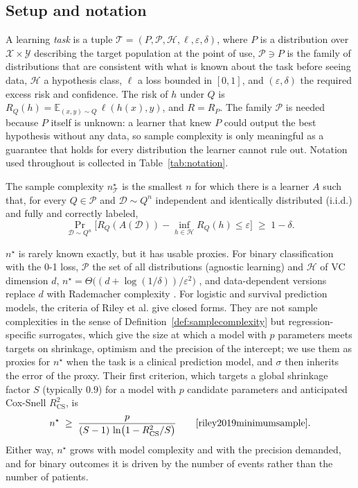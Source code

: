 \documentclass[acmsmall,screen,review]{acmart}
\theoremstyle{acmdefinition}
\begin{document}
\subsection{Setup and notation}

A learning \emph{task} is a tuple $\mathcal{T}=(P,\mathcal{P},\mathcal{H},\ell,\varepsilon,\delta)$, where $P$ is a distribution over $\mathcal{X}\times\mathcal{Y}$ describing the target population at the point of use, $\mathcal{P}\ni P$ is the family of distributions that are consistent with what is known about the task before seeing data, $\mathcal{H}$ a hypothesis class, $\ell$ a loss bounded in $[0,1]$, and $(\varepsilon,\delta)$ the required excess risk and confidence. The risk of $h$ under $Q$ is $R_Q(h)=\mathbb{E}_{(x,y)\sim Q}\,\ell(h(x),y)$, and $R=R_P$. The family $\mathcal{P}$ is needed because $P$ itself is unknown: a learner that knew $P$ could output the best hypothesis without any data, so sample complexity is only meaningful as a guarantee that holds for every distribution the learner cannot rule out. Notation used throughout is collected in Table~\ref{tab:notation}.

\begin{definition}\label{def:samplecomplexity}
The sample complexity $n^{\star}_{\mathcal{T}}$ is the smallest $n$ for which there is a learner $A$ such that, for every $Q\in\mathcal{P}$ and $\mathcal{D}\sim Q^n$ independent and identically distributed (i.i.d.) and fully and correctly labeled,
\[
\Pr_{\mathcal{D}\sim Q^n} \Big[R_Q(A(\mathcal{D})) - \inf_{h\in\mathcal{H}} R_Q(h) \le \varepsilon\Big] \;\ge\; 1-\delta.
\]
\end{definition}

$n^{\star}$ is rarely known exactly, but it has usable proxies. For binary classification with the 0-1 loss, $\mathcal{P}$ the set of all distributions (agnostic learning) and $\mathcal{H}$ of VC dimension $d$, $n^{\star}=\Theta\bigl((d+\log(1/\delta))/\varepsilon^2\bigr)$ \cite{shalevshwartz2014understanding}, and data-dependent versions replace $d$ with Rademacher complexity \cite{bartlett2002rademacher}. For logistic and survival prediction models, the criteria of Riley et al. give closed forms. They are not sample complexities in the sense of Definition~\ref{def:samplecomplexity} but regression-specific surrogates, which give the size at which a model with $p$ parameters meets targets on shrinkage, optimism and the precision of the intercept; we use them as proxies for $n^{\star}$ when the task is a clinical prediction model, and $\sigma$ then inherits the error of the proxy. Their first criterion, which targets a global shrinkage factor $S$ (typically $0.9$) for a model with $p$ candidate parameters and anticipated Cox-Snell $R^2_{\mathrm{CS}}$, is
\begin{equation}\label{eq:riley}
n^{\star} \;\ge\; \frac{p}{(S-1)\,\ln\bigl(1-R^2_{\mathrm{CS}}/S\bigr)} \qquad \text{\cite{riley2019minimumsample}.}
\end{equation}
Either way, $n^{\star}$ grows with model complexity and with the precision demanded, and for binary outcomes it is driven by the number of events rather than the number of patients.
\end{document}

